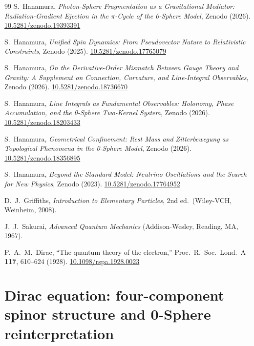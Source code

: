 \documentclass[%
 reprint, amsmath,amssymb, aps, prb, ]{revtex4-2}
\numberwithin{equation}{section}
\begin{document}
\begin{thebibliography}{99}
S.~Hanamura, \textit{Photon-Sphere Fragmentation as a Gravitational Mediator: Radiation-Gradient Ejection in the $\pi$-Cycle of the 0-Sphere Model}, Zenodo (2026). \href{https://doi.org/10.5281/zenodo.19393391}{10.5281/zenodo.19393391}

S.~Hanamura, \textit{Unified Spin Dynamics: From Pseudovector Nature to Relativistic Constraints}, Zenodo (2025). \href{https://doi.org/10.5281/zenodo.17765079}{10.5281/zenodo.17765079}

S.~Hanamura, \textit{On the Derivative-Order Mismatch Between Gauge Theory and Gravity: A Supplement on Connection, Curvature, and Line-Integral Observables}, Zenodo (2026). \href{https://doi.org/10.5281/zenodo.18736670}{10.5281/zenodo.18736670}

S.~Hanamura, \textit{Line Integrals as Fundamental Observables: Holonomy, Phase Accumulation, and the 0-Sphere Two-Kernel System}, Zenodo (2026). \href{https://doi.org/10.5281/zenodo.18203433}{10.5281/zenodo.18203433}

S.~Hanamura, \textit{Geometrical Confinement: Rest Mass and Zitterbewegung as Topological Phenomena in the 0-Sphere Model}, Zenodo (2026). \href{https://doi.org/10.5281/zenodo.18356895}{10.5281/zenodo.18356895}

S.~Hanamura, \textit{Beyond the Standard Model: Neutrino Oscillations and the Search for New Physics}, Zenodo (2023). \href{https://doi.org/10.5281/zenodo.17764952}{10.5281/zenodo.17764952}

D.~J.~Griffiths, \textit{Introduction to Elementary Particles}, 2nd ed.\ (Wiley-VCH, Weinheim, 2008).

J.~J.~Sakurai, \textit{Advanced Quantum Mechanics} (Addison-Wesley, Reading, MA, 1967).

P.~A.~M.~Dirac, ``The quantum theory of the electron,'' Proc.\ R.\ Soc.\ Lond.\ A \textbf{117}, 610--624 (1928). \href{https://doi.org/10.1098/rspa.1928.0023}{10.1098/rspa.1928.0023}

\end{thebibliography}

\appendix

\section{Dirac equation: four-component spinor structure and 0-Sphere reinterpretation}
\label{app:dirac}
\end{document}
